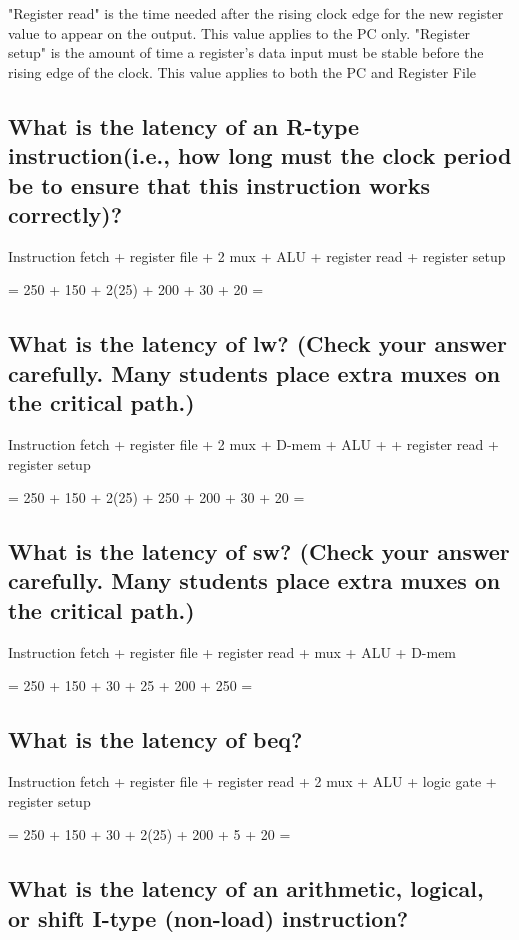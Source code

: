 \documentclass{article}
\begin{document}
"Register read" is the time needed after the rising clock edge for the new register value to appear on the output. This value applies to the PC only. "Register setup" is the amount of time a register's data input must be stable before the rising edge of the clock. This value applies to both the PC and Register File

\subsection{What is the latency of an R-type instruction(i.e., how long must the clock period be to ensure that this instruction works correctly)?}

Instruction fetch + register file + 2 mux + ALU + register read + register setup 

= 250 + 150 + 2(25) + 200 + 30 + 20  = 


\subsection{What is the latency of lw? (Check your answer carefully. Many students place extra muxes on the critical path.)}

Instruction fetch + register file + 2 mux + D-mem + ALU + + register read + register setup

= 250 + 150 + 2(25) + 250 + 200 + 30 + 20 = 

\subsection{What is the latency of sw? (Check your answer carefully. Many students place extra muxes on the critical path.)}

Instruction fetch + register file + register read + mux + ALU + D-mem

= 250 + 150 + 30 + 25 + 200 + 250 = 

\subsection{What is the latency of beq?}

Instruction fetch + register file + register read + 2 mux + ALU + logic gate + register setup

= 250 + 150 + 30 + 2(25) + 200 + 5 + 20 = 

\subsection{What is the latency of an arithmetic, logical, or shift I-type (non-load) instruction?}
\end{document}
